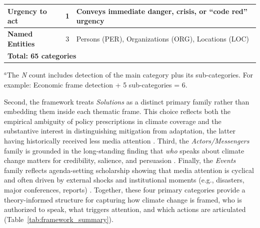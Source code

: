\documentclass[12pt]{article}
\renewcommand\_{\texttt{\detokenize{_}\allowbreak}}
\begin{document}
\begin{table}[b!]
\begin{tabularx}{\textwidth}{lcX}
\midrule
\cellcolor{gray!10}\textbf{Urgency to act} & \cellcolor{gray!10}1 & \cellcolor{gray!10}Conveys immediate danger, crisis, or ``code red'' urgency \\
\midrule
\cellcolor{gray!10}\textbf{Named Entities} & \cellcolor{gray!10}3 & \cellcolor{gray!10}Persons (PER), Organizations (ORG), Locations (LOC) \\
\midrule
\multicolumn{3}{l}{\cellcolor{gray!25}\textbf{Total: 65 categories}} \\
\bottomrule
\end{tabularx}
\vspace{-0.1em}
{\footnotesize $^a$The \emph{N} count includes detection of the main category plus its sub-categories. For example: Economic frame detection + 5 sub-categories = 6.}
\end{table}

Second, the framework treats \emph{Solutions} as a distinct primary family rather than embedding them inside each thematic frame. This choice reflects both the empirical ambiguity of policy prescriptions in climate coverage and the substantive interest in distinguishing mitigation from adaptation, the latter having historically received less media attention \autocite{ford_coverage_2015}. Third, the \emph{Actors/Messengers} family is grounded in the long-standing finding that \emph{who} speaks about climate change matters for credibility, salience, and persuasion \autocite{trumbo_constructing_1996, boykoff_who_2011}. Finally, the \emph{Events} family reflects agenda-setting scholarship showing that media attention is cyclical and often driven by external shocks and institutional moments (e.g., disasters, major conferences, reports) \autocite{downs_up_1972, liu_explaining_2011}. Together, these four primary categories provide a theory-informed structure for capturing how climate change is framed, who is authorized to speak, what triggers attention, and which actions are articulated (Table~\ref{tab:framework_summary}).
\end{document}
